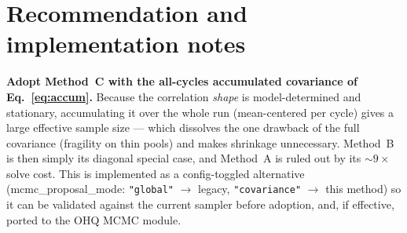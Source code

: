 \documentclass[11pt]{article}
\newcommand{\code}[1]{\texttt{\small #1}}
\newcommand{\param}[1]{\textsf{#1}}
\begin{document}
\section{Recommendation and implementation notes}

\textbf{Adopt Method~C with the all-cycles accumulated covariance of
Eq.~\eqref{eq:accum}.} Because the correlation \emph{shape} is
model-determined and stationary, accumulating it over the whole run
(mean-centered per cycle) gives a large effective sample size --- which
dissolves the one drawback of the full covariance (fragility on thin
pools) and makes shrinkage unnecessary. Method~B is then simply its
diagonal special case, and Method~A is ruled out by its $\sim\!9\times$
solve cost. This is implemented as a config-toggled alternative
(\param{mcmc\_proposal\_mode}: \code{"global"} $\to$ legacy,
\code{"covariance"} $\to$ this method) so it can be validated against the
current sampler before adoption, and, if effective, ported to the OHQ MCMC
module.
\end{document}
